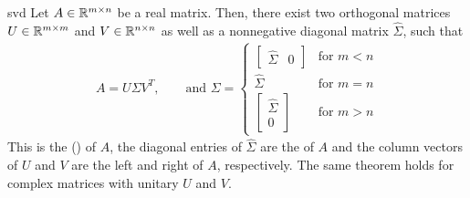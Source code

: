 \begin{Theorem}{svd}
  Let $A\in\mathbb R^{m\times n}$ be a real matrix. Then, there exist two
  orthogonal matrices $U\in\mathbb R^{m\times m}$ and $V\in \mathbb R^{n\times n}$
  as well as a nonnegative diagonal matrix $\hat\Sigma$, such
  that
  \begin{gather}
    \label{eq:svd:1}
    A = U \Sigma V^T,
    \qquad\text{and }
    \Sigma =
    \begin{cases}
      \begin{bmatrix}
        \hat\Sigma &0
      \end{bmatrix}
      &\text{for } m<n\\
      \hat\Sigma&\text{for } m=n\\
      \begin{bmatrix}
        \hat\Sigma \\0
      \end{bmatrix}
      &\text{for } m>n
    \end{cases}
  \end{gather}
  This is the  () of
  $A$, the diagonal entries of $\hat \Sigma$ are the
   of $A$ and the column vectors of $U$ and
  $V$ are the left and right  of $A$,
  respectively. The same theorem holds for complex matrices with
  unitary $U$ and $V$.
\end{Theorem}

